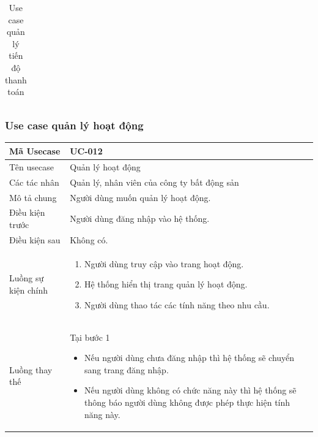 \documentclass[12pt,a4paper]{article}
\begin{document}
\begin{table}[H]
\begin{tabular}{|p{3.5cm}|p{11.5cm}|c|}
            \\ \hline
        \end{tabular}
        \caption{Use case quản lý tiến độ thanh toán}

    \end{table}


    \subsubsection*{Use case quản lý hoạt động}
    \begin{table}[H]
        \centering
        \begin{tabular}{|p{3.5cm}|p{11.5cm}|c|}
            \hline
            Mã Usecase      & UC-012                                      \\
            \hline
            Tên usecase     & Quản lý hoạt động                           \\
            \hline
            Các tác nhân    & Quản lý, nhân viên của công ty bất động sản \\
            \hline
            Mô tả chung     & Người dùng muốn quản lý hoạt động.          \\
            \hline

            Điều kiện trước & Người dùng đăng nhập vào hệ thống.          \\
            \hline

            Điều kiện sau   & Không có.                                   \\
            \hline

            Luồng sự kiện chính & \vspace{-.8cm}\begin{enumerate}
                                                    \item Người dùng truy cập vào trang hoạt động.
                                                    \item Hệ thống hiển thị trang quản lý hoạt động.
                                                    \item Người dùng thao tác các tính năng theo nhu cầu.
            \end{enumerate}
            \\
            \hline
            Luồng thay thế & Tại bước 1\newline
            \vspace{-.8cm}\begin{itemize}
                              \item Nếu người dùng chưa đăng nhập thì hệ thống sẽ chuyển sang trang đăng nhập.
                              \item Nếu người dùng không có chức năng này thì hệ thống sẽ thông báo người dùng không được phép thực hiện tính năng này.
            \end{itemize}


\end{tabular}
\end{table}
\end{document}
